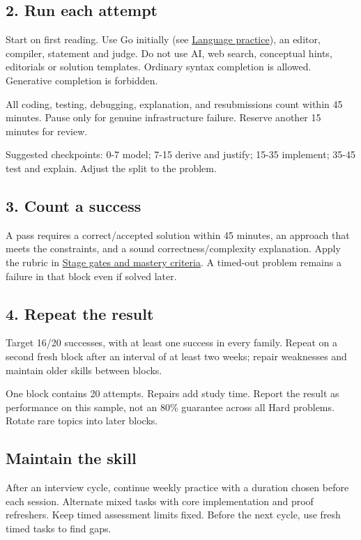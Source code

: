 \documentclass[11pt,letterpaper]{article}
\begin{document}
\subsection*{2. Run each attempt}

Start on first reading. Use Go initially (see \hyperref[sec:24]{Language practice}), an editor, compiler, statement and judge. Do not use AI, web search, conceptual hints, editorials or solution templates. Ordinary syntax completion is allowed. Generative completion is forbidden.

All coding, testing, debugging, explanation, and resubmissions count within 45 minutes. Pause only for genuine infrastructure failure. Reserve another 15 minutes for review.

Suggested checkpoints: 0-7 model; 7-15 derive and justify; 15-35 implement; 35-45 test and explain. Adjust the split to the problem.

\subsection*{3. Count a success}

A pass requires a correct/accepted solution within 45 minutes, an approach that meets the constraints, and a sound correctness/complexity explanation. Apply the rubric in \hyperref[sec:22]{Stage gates and mastery criteria}. A timed-out problem remains a failure in that block even if solved later.

\subsection*{4. Repeat the result}

Target 16/20 successes, with at least one success in every family. Repeat on a second fresh block after an interval of at least two weeks; repair weaknesses and maintain older skills between blocks.

One block contains 20 attempts. Repairs add study time. Report the result as performance on this sample, not an 80\% guarantee across all Hard problems. Rotate rare topics into later blocks.

\subsection*{Maintain the skill}

After an interview cycle, continue weekly practice with a duration chosen before each session. Alternate mixed tasks with core implementation and proof refreshers. Keep timed assessment limits fixed. Before the next cycle, use fresh timed tasks to find gaps.
\end{document}

